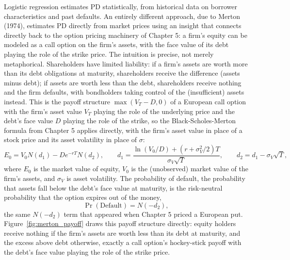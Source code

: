 \documentclass[../ai_in_finance]{subfiles}
\begin{document}
Logistic regression estimates PD statistically, from historical data on borrower characteristics and past defaults. An entirely different approach, due to Merton (1974), estimates PD directly from market prices using an insight that connects directly back to the option pricing machinery of Chapter 5: a firm's equity can be modeled as a call option on the firm's assets, with the face value of its debt playing the role of the strike price.
The intuition is precise, not merely metaphorical. Shareholders have limited liability: if a firm's assets are worth more than its debt obligations at maturity, shareholders receive the difference (assets minus debt); if assets are worth less than the debt, shareholders receive nothing and the firm defaults, with bondholders taking control of the (insufficient) assets instead.
This is the payoff structure $\max(V_T - D, 0)$ of a European call option with the firm's asset value $V_T$ playing the role of the underlying price and the debt's face value $D$ playing the role of the strike, so the Black-Scholes-Merton formula from Chapter 5 applies directly, with the firm's asset value in place of a stock price and its asset volatility in place of $\sigma$:
\begin{equation*}
E_0 = V_0 N(d_1) - D e^{-rT} N(d_2), \qquad d_1 = \frac{\ln(V_0/D) + (r + \sigma_V^2/2)T}{\sigma_V\sqrt{T}}, \qquad d_2 = d_1 - \sigma_V\sqrt{T},
\end{equation*}
where $E_0$ is the market value of equity, $V_0$ is the (unobserved) market value of the firm's assets, and $\sigma_V$ is asset volatility. The probability of default, the probability that assets fall below the debt's face value at maturity, is the risk-neutral probability that the option expires out of the money,
$$\Pr(\text{Default}) = N(-d_2),$$
the same $N(-d_2)$ term that appeared when Chapter 5 priced a European put. Figure~\ref{fig:merton_payoff} draws this payoff structure directly: equity holders receive nothing if the firm's assets are worth less than its debt at maturity, and the excess above debt otherwise, exactly a call option's hockey-stick payoff with the debt's face value playing the role of the strike price.
\end{document}
